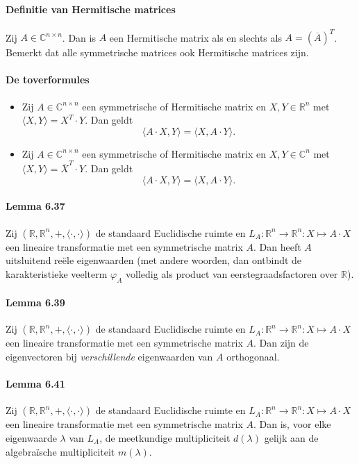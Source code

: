 \documentclass[11pt,oneside,a4paper]{article}
\begin{document}
	\paragraph{Definitie van Hermitische matrices}
		Zij $A \in \mathbb{C}^{n \times n}$. Dan is $A$ een Hermitische matrix als en slechts als $A = \left(\overline{A}\right)^T$. \\ Bemerkt dat alle symmetrische matrices ook Hermitische matrices zijn.
 	\paragraph{De toverformules}
		\begin{itemize}
			\item Zij $A \in \mathbb{C}^{n \times n}$ een symmetrische of Hermitische matrix en $X, Y \in \mathbb{R}^n$ met $\langle X , Y \rangle = X^T\cdot Y$. Dan geldt $$\langle A \cdot X , Y \rangle = \langle X , A \cdot Y \rangle.$$
			\item Zij $A \in \mathbb{C}^{n \times n}$ een symmetrische of Hermitische matrix en $X, Y \in \mathbb{C}^n$ met $\langle X , Y \rangle = \overline{X}^T \cdot Y$. Dan geldt $$\langle A \cdot X , Y \rangle = \langle X , A \cdot Y \rangle.$$
		\end{itemize}
	\paragraph{Lemma 6.37}
		Zij $(\mathbb{R},\mathbb{R}^n,+, \langle \cdot , \cdot \rangle)$ de standaard Euclidische ruimte en $L_A : \mathbb{R}^n \to \mathbb{R}^n: X \mapsto A \cdot X$ een lineaire transformatie met een symmetrische matrix $A$. Dan heeft $A$ uitsluitend reële eigenwaarden (met andere woorden, dan ontbindt de karakteristieke veelterm $\varphi_A$ volledig als product van eerstegraadsfactoren over $\mathbb{R}$).
	\paragraph{Lemma 6.39}
		Zij $(\mathbb{R},\mathbb{R}^n,+, \langle \cdot , \cdot \rangle)$ de standaard Euclidische ruimte en $L_A : \mathbb{R}^n \to \mathbb{R}^n: X \mapsto A \cdot X$ een lineaire transformatie met een symmetrische matrix $A$. Dan zijn de eigenvectoren bij \textit{verschillende} eigenwaarden van $A$ orthogonaal.
	\paragraph{Lemma 6.41}
		Zij $(\mathbb{R},\mathbb{R}^n,+, \langle \cdot , \cdot \rangle)$ de standaard Euclidische ruimte en $L_A: \mathbb{R}^n \to \mathbb{R}^n: X \mapsto A \cdot X$ een lineaire transformatie met een symmetrische matrix $A$. Dan is, voor elke eigenwaarde $\lambda$ van $L_A$, de meetkundige multipliciteit $d(\lambda)$ gelijk aan de algebraïsche multipliciteit $m(\lambda)$.
\end{document}
